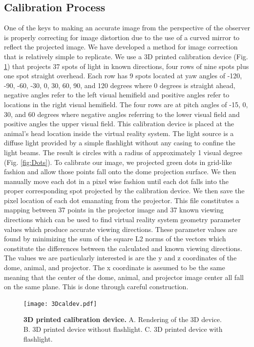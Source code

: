 \documentclass[10pt,letterpaper]{article}
\begin{document}
\subsection*{Calibration Process}
One of the keys to making an accurate image from the perspective of the observer is properly correcting for image distortion due to the use of a curved mirror to 
reflect the projected image. We have developed a method for image correction that is relatively simple to replicate. We use a 3D printed calibration device (Fig. \ref{fig:3Ddev}) 
that projects 37 spots of light in known directions, four rows of nine spots plus one spot straight overhead. Each row has 9 spots located at yaw angles of -120, -90, 
-60, -30, 0, 30, 60, 90, and 120 degrees where 0 degrees is straight ahead, negative angles refer to the left visual hemifield and positive angles refer to locations in 
the right visual hemifield. The four rows are at pitch angles of -15, 0, 30, and 60 degrees where negative angles referring to the lower visual field and positive angles 
the upper visual field. This calibration device is placed at the animal's head location inside the virtual reality system. The light source is a diffuse light provided by a 
simple flashlight without any casing to confine the light beams. The result is circles with a radius of approximately 1 visual degree (Fig. \ref{fig:Dots}). To calibrate 
our image, we projected green dots in grid-like fashion and allow those points fall onto the dome projection surface. We then manually move each dot in a pixel wise 
fashion until each dot falls into the proper corresponding spot projected by the calibration device. We then save the pixel location of each dot emanating from the 
projector. This file constitutes a mapping between 37 points in the projector image and 37 known viewing directions which can be used to find virtual reality system 
geometry parameter values which produce accurate viewing directions. These parameter values are found by minimizing the sum of the square L2 norms of the 
vectors which constitute the differences between the calculated and known viewing directions. The values we are particularly interested is are the y and z coordinates 
of the dome, animal, and projector. The x coordinate is assumed to be the same meaning that the center of the dome, animal, and projector image center all fall on the 
same plane. This is done through careful construction. 

\begin{figure}[h]
\centering
\texttt{[image: 3Dcaldev.pdf]}
\caption{{\bf 3D printed calibration device.}
A. Rendering of the 3D device. B. 3D printed device without flashlight. C. 3D printed device with flashlight.}
\label{fig:3Ddev}
\end{figure}
\end{document}
